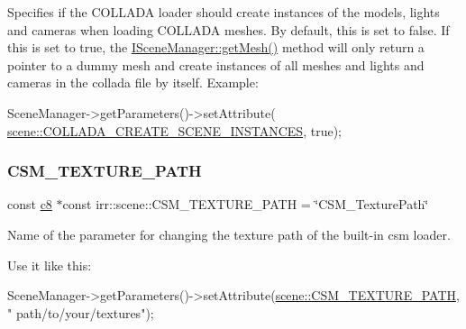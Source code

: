 Specifies if the C\+O\+L\+L\+A\+DA loader should create instances of the models, lights and cameras when loading C\+O\+L\+L\+A\+DA meshes. By default, this is set to false. If this is set to true, the \hyperlink{classirr_1_1scene_1_1ISceneManager_a63894c3f3d46cfc385116f1705935e03}{I\+Scene\+Manager\+::get\+Mesh()} method will only return a pointer to a dummy mesh and create instances of all meshes and lights and cameras in the collada file by itself. Example\+: 
\begin{DoxyCode}
SceneManager->getParameters()->setAttribute(
      \hyperlink{namespaceirr_1_1scene_ae48f9ce9a33957cc0d86171d6f2e4535}{scene::COLLADA\_CREATE\_SCENE\_INSTANCES}, \textcolor{keyword}{true});
\end{DoxyCode}
 \mbox{\label{namespaceirr_1_1scene_a72a3b82394847d221a79863b2d0f3cae}} 
\subsubsection{\texorpdfstring{C\+S\+M\+\_\+\+T\+E\+X\+T\+U\+R\+E\+\_\+\+P\+A\+TH}{CSM\_TEXTURE\_PATH}}
{\footnotesize\ttfamily const \hyperlink{namespaceirr_a9395eaea339bcb546b319e9c96bf7410}{c8} $\ast$const irr\+::scene\+::\+C\+S\+M\+\_\+\+T\+E\+X\+T\+U\+R\+E\+\_\+\+P\+A\+TH = \char`\"{}C\+S\+M\+\_\+\+Texture\+Path\char`\"{}}



Name of the parameter for changing the texture path of the built-\/in csm loader. 

Use it like this\+: 
\begin{DoxyCode}
SceneManager->getParameters()->setAttribute(\hyperlink{namespaceirr_1_1scene_a72a3b82394847d221a79863b2d0f3cae}{scene::CSM\_TEXTURE\_PATH}, \textcolor{stringliteral}{"
      path/to/your/textures"});
\end{DoxyCode}
 \mbox{\label{namespaceirr_1_1scene_a6e821825be0878c0f51491a664fa4bb9}} 
